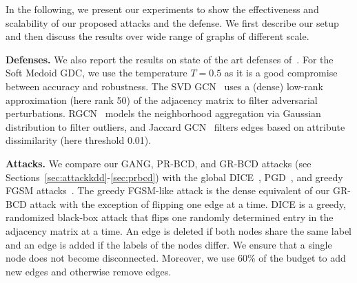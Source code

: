 \documentclass[sigconf,authordraft]{acmart}
\newcommand{\todo}[1]{\textcolor{red}{(Todo: #1)}}
\begin{document}
In the following, we present our experiments to show the effectiveness and scalability of our proposed attacks and the defense. We first describe our setup and then discuss the results over wide range of graphs of different scale. %

\textbf{Defenses.} We also report the results on state of the art defenses of~\citep{Entezari2020, Geisler2020, Wu2019, Zhu2019}. For the Soft Medoid GDC, we use the temperature \(T=0.5\) as it is a good compromise between accuracy and robustness. The SVD GCN~\citep{Entezari2020} uses a (dense) low-rank approximation (here rank 50) of the adjacency matrix to filter adversarial perturbations. RGCN~\citep{Zhu2019} models the neighborhood aggregation via Gaussian distribution to filter outliers, and Jaccard GCN~\citep{Wu2019} filters edges based on attribute dissimilarity (here threshold 0.01).


\textbf{Attacks.} We compare our GANG, PR-BCD, and GR-BCD attacks (see Sections~\ref{sec:attackkdd}-\ref{sec:prbcd}) with the global DICE~\citep{Waniek2018}, PGD~\citep{Xu2019a}, and greedy FGSM attacks~\citet{Geisler2020}. The greedy FGSM-like attack is the dense equivalent of our GR-BCD attack with the exception of flipping one edge at a time. DICE is a greedy, randomized black-box attack that flips one randomly determined entry in the adjacency matrix at a time. An edge is deleted if both nodes share the same label and an edge is added if the labels of the nodes differ. We ensure that a single node does not become disconnected. Moreover, we use 60\% of the budget to add new edges and otherwise remove edges.
\end{document}
